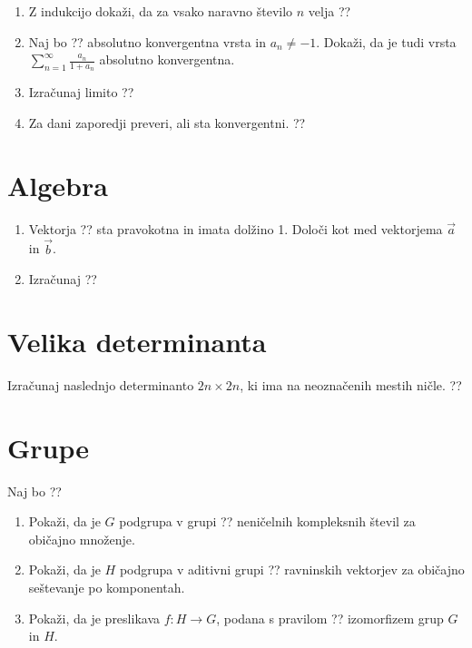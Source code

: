 \documentclass[a4paper,12pt]{article}
\begin{document}
\begin{enumerate}
\item
Z indukcijo dokaži, da za vsako naravno število \(n\) velja
??

\item
Naj bo ?? absolutno konvergentna vrsta in \(a_n \ne -1\).
Dokaži, da je tudi vrsta \(\sum_{n=1}^\infty \frac{a_n}{1+a_n}\)
absolutno konvergentna.

\item
Izračunaj limito
??

\item
Za dani zaporedji preveri, ali sta konvergentni.
??
\end{enumerate}

\section*{Algebra}

\begin{enumerate}
\item
Vektorja ??
sta pravokotna in imata dolžino 1. Določi kot med vektorjema \(\vec{a}\) in \(\vec{b}\).

\item
Izračunaj
??
\end{enumerate}

\section*{Velika determinanta}

Izračunaj naslednjo determinanto \(2n \times 2n\), ki ima na neoznačenih mestih ničle.
??
%
%

\section*{Grupe}

Naj bo
??
\begin{enumerate}
\item
Pokaži, da je \(G\) podgrupa v grupi ??
neničelnih kompleksnih števil za običajno množenje.

\item
Pokaži, da je \(H\) podgrupa v aditivni grupi ??
ravninskih vektorjev za običajno seštevanje po komponentah.

\item
Pokaži, da je preslikava \(f:H\to G\), podana s pravilom
??
izomorfizem grup \(G\) in \(H\).
\end{enumerate}
\end{document}

